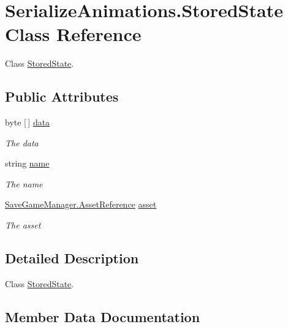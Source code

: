 \hypertarget{class_serialize_animations_1_1_stored_state}{}\section{Serialize\+Animations.\+Stored\+State Class Reference}
\label{class_serialize_animations_1_1_stored_state}


Class \hyperlink{class_serialize_animations_1_1_stored_state}{Stored\+State}.  


\subsection*{Public Attributes}
\begin{DoxyCompactItemize}
\item 
byte \mbox{[}$\,$\mbox{]} \hyperlink{class_serialize_animations_1_1_stored_state_a7689e54eaf7039191650d5008df1b8e2}{data}
\begin{DoxyCompactList}\small\item\em The data \end{DoxyCompactList}\item 
string \hyperlink{class_serialize_animations_1_1_stored_state_a2672a0862ad5485351ea58c5e61cbe58}{name}
\begin{DoxyCompactList}\small\item\em The name \end{DoxyCompactList}\item 
\hyperlink{class_save_game_manager_1_1_asset_reference}{Save\+Game\+Manager.\+Asset\+Reference} \hyperlink{class_serialize_animations_1_1_stored_state_ad23989e0d99d1521ae4e3c67b30b496e}{asset}
\begin{DoxyCompactList}\small\item\em The asset \end{DoxyCompactList}\end{DoxyCompactItemize}


\subsection{Detailed Description}
Class \hyperlink{class_serialize_animations_1_1_stored_state}{Stored\+State}. 



\subsection{Member Data Documentation}
\mbox{\label{class_serialize_animations_1_1_stored_state_ad23989e0d99d1521ae4e3c67b30b496e}} 
